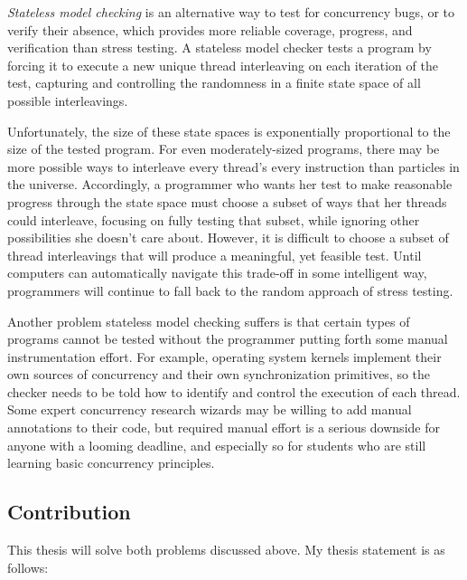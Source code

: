 {\em Stateless model checking} \cite{verisoft} is an alternative way to test for concurrency bugs,
or to verify their absence,
which provides more reliable coverage, progress, and verification than stress testing.
A stateless model checker tests a program by forcing it to execute a new unique thread interleaving on each iteration of the test,
capturing and controlling the randomness in a finite state space of all possible interleavings.

Unfortunately, the size of these state spaces is exponentially proportional to the size of the tested program.
For even moderately-sized programs, there may be more possible ways to interleave every thread's every instruction
than particles in the universe.
Accordingly, a programmer who wants her test to make reasonable progress through the state space must choose a subset of ways that her threads could interleave,
focusing on fully testing that subset, while ignoring other possibilities she doesn't care about.
However, it is difficult to choose a subset of thread interleavings that will produce a meaningful, yet feasible test.
Until computers can automatically navigate this trade-off in some intelligent way,
programmers will continue to fall back to the random approach of stress testing.

Another problem stateless model checking suffers is that certain types of programs cannot be tested without the programmer putting forth some manual instrumentation effort.
For example, operating system kernels implement their own sources of concurrency and their own synchronization primitives,
so the checker needs to be told how to identify and control the execution of each thread.
Some expert concurrency research wizards may be willing to add manual annotations to their code,
but required manual effort is a serious downside for anyone with a looming deadline,
and especially so for students who are still learning basic concurrency principles.

\subsection{Contribution}

This thesis will solve both problems discussed above.
My thesis statement is as follows:

